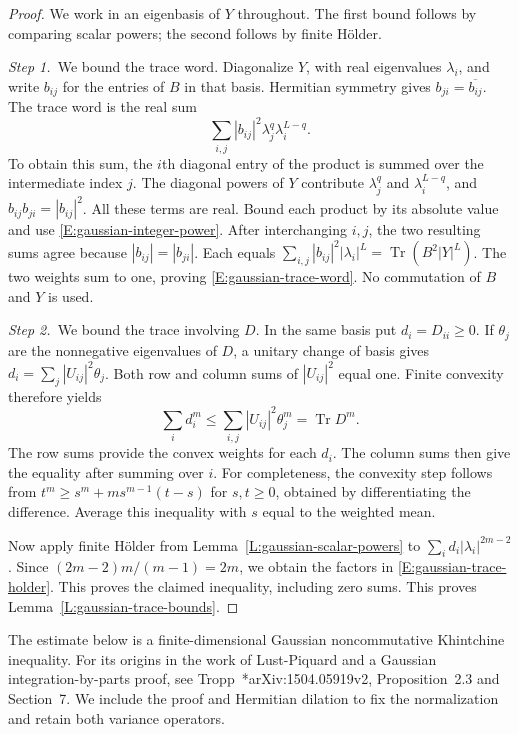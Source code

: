 \begin{proof}
  We work in an eigenbasis of $Y$ throughout. The first bound follows by
  comparing scalar powers; the second follows by finite H\"older.

  \medskip
  \noindent\textit{Step 1.~}We bound the trace word.
  Diagonalize $Y$, with real eigenvalues $\lambda_i$, and write $b_{ij}$ for the
  entries of $B$ in that basis. Hermitian symmetry gives $b_{ji} =
  \overline{b_{ij}}$. The trace word is the real sum
  \[
    \sum_{i,j}|b_{ij}|^2\lambda_j^q\lambda_i^{L-q}.
  \]
  To obtain this sum, the $i$th diagonal entry of the product is summed over
  the intermediate index $j$. The diagonal powers of $Y$ contribute
  $\lambda_j^q$ and $\lambda_i^{L-q}$, and $b_{ij}b_{ji} = |b_{ij}|^2$. All
  these terms are real.
  Bound each product by its absolute value and use
  \eqref{E:gaussian-integer-power}. After interchanging $i,j$, the two resulting
  sums agree because $|b_{ij}| = |b_{ji}|$. Each equals
  $\sum_{i,j}|b_{ij}|^2|\lambda_i|^L = \operatorname{Tr}(B^2|Y|^L)$. The two
  weights sum to one, proving \eqref{E:gaussian-trace-word}. No commutation of
  $B$ and $Y$ is used.


  \medskip
  \noindent\textit{Step 2.~}We bound the trace involving $D$.
  In the same basis put $d_i = D_{ii} \ge 0$. If $\theta_j$ are the nonnegative
  eigenvalues of $D$, a unitary change of basis gives $d_i =
  \sum_j|U_{ij}|^2\theta_j$. Both row and column sums of $|U_{ij}|^2$ equal one.
  Finite convexity therefore yields
  \[
    \sum_i d_i^m \le \sum_{i,j}|U_{ij}|^2\theta_j^m
    = \operatorname{Tr}D^m.
  \]
  The row sums provide the convex weights for each $d_i$. The column sums
  then give the equality after summing over $i$.
  For completeness, the convexity step follows from $t^m \ge s^m+ms^{m-1}(t-s)$
  for $s,t \ge 0$, obtained by differentiating the difference. Average this
  inequality with $s$ equal to the weighted mean.

  Now apply finite H\"older from
  Lemma~\ref{L:gaussian-scalar-powers} to $\sum_i d_i|\lambda_i|^{2m-2}$. Since
  $(2m-2)m/(m-1) = 2m$, we obtain the factors in
  \eqref{E:gaussian-trace-holder}.
  This proves the claimed inequality,
  including zero sums. This proves Lemma~\ref{L:gaussian-trace-bounds}.
\end{proof}

The estimate below is a finite-dimensional Gaussian noncommutative Khintchine
inequality. For its origins in the work of Lust-Piquard and a Gaussian
integration-by-parts proof, see Tropp~\cite{tropp:source2018:second-order}*{arXiv:1504.05919v2,
Proposition~2.3 and Section~7}. We include the proof and Hermitian dilation
to fix the normalization and retain both variance operators.

